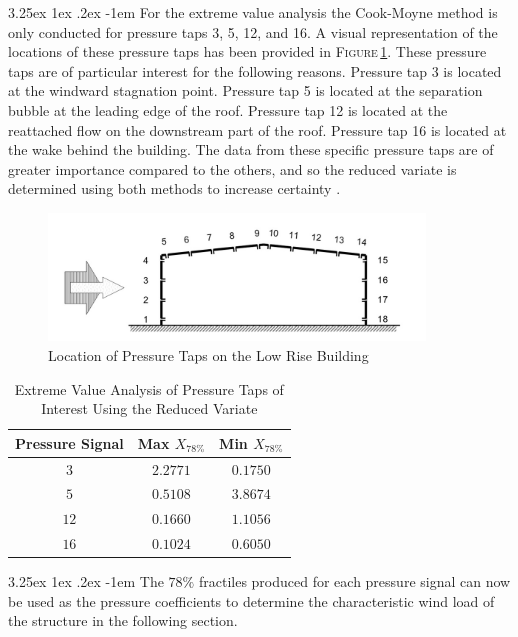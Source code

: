 \documentclass[11pt,a4paper,titlepage]{report}
\makeatletter
\renewcommand\paragraph{\@startsection{paragraph}{5}{\z@}%
  {3.25ex \@plus1ex \@minus.2ex}%
  {-1em}%
  {\normalfont\normalsize\bfseries}}
\makeatother
\begin{document}
\paragraph{}For the extreme value analysis the Cook-Moyne method is only conducted for pressure taps 3, 5, 12, and 16. A visual representation of the locations of these pressure taps has been provided in \textsc{Figure}\,\ref{fig:I.7: pressure tap locations}. These pressure taps are of particular interest for the following reasons. Pressure tap 3 is located at the windward stagnation point. Pressure tap 5 is located at the separation bubble at the leading edge of the roof. Pressure tap 12 is located at the reattached flow on the downstream part of the roof. Pressure tap 16 is located at the wake behind the building. The data from these specific pressure taps are of greater importance compared to the others, and so the reduced variate is determined using both methods to increase certainty \cite{WE}. 
\begin{figure}
    \centering
    \includegraphics[width=10cm]{Pressure_Tap.jpeg}
    \caption{Location of Pressure Taps on the Low Rise Building}
    \label{fig:I.7: pressure tap locations}
\end{figure}
\begin{table}[h]
    \centering
    \begin{tabular}{c|c|c}
      Pressure Signal & Max $X_{78\%}$ & Min $X_{78\%}$ \\
      \hline
      $3$ & $2.2771$ & $0.1750$ \\
      $5$ & $0.5108$ & $3.8674$ \\
      $12$ & $0.1660$ & $1.1056$ \\
      $16$ & $0.1024$ & $0.6050$ \\
    \end{tabular}
    \caption{Extreme Value Analysis of Pressure Taps of Interest Using the Reduced Variate}
    \label{tab:extreme}
\end{table}
\paragraph{}The $78\%$ fractiles produced for each pressure signal can now be used as the pressure coefficients to determine the characteristic wind load of the structure in the following section. 
\end{document}
